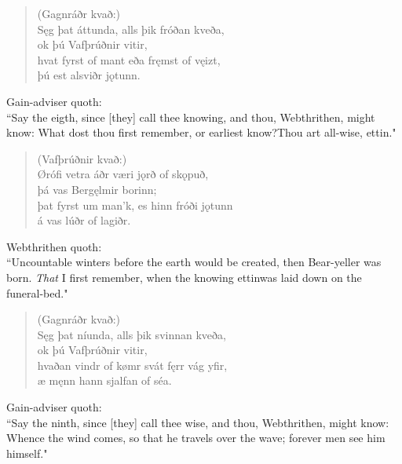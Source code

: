 \begin{verse}
(Gagnráðr kvað:) \\%
\bva Sęg þat áttunda, \hld alls þik fróðan kveða, \\%
\ind ok þú Vafþrúðnir vitir, \\%
hvat fyrst of mant \hld eða fręmst of vęizt, \\%
\ind þú est alsviðr jǫtunn.\\%
\end{verse}

\bvb Gain-adviser quoth: \\ “Say the eigth, since [they] call thee knowing, and thou, Webthrithen, might know: What dost thou first remember, or earliest know?\footnotemark[55] Thou art all-wise, ettin." \\

\begin{verse}
(Vafþrúðnir kvað:) \\%
\bva Ørófi vetra \hld áðr væri jǫrð of skǫpuð, \\%
\ind þá vas Bergęlmir borinn; \\%
þat fyrst um man'k, \hld es hinn fróði jǫtunn \\%
\ind á vas lúðr of lagiðr.\footnotemark[30]\\%
\end{verse}

\bvb Webthrithen quoth: \\ “Uncountable winters before the earth would be created, then Bear-yeller was born. \emph{That} I first remember, when the knowing ettin\footnotemark[60] was laid down on the funeral-bed\footnotemark[61]." \\

\begin{verse}
(Gagnráðr kvað:) \\%
\bva Sęg þat níunda, \hld alls þik svinnan kveða, \\%
\ind ok þú Vafþrúðnir vitir, \\%
hvaðan vindr of kømr \hld svát fęrr vág yfir, \\%
\ind æ męnn hann sjalfan of séa.\\%
\end{verse}

\bvb Gain-adviser quoth: \\ “Say the ninth, since [they] call thee wise, and thou, Webthrithen, might know: Whence the wind comes, so that he travels over the wave; forever men see him himself.\footnotemark[65]" \\

